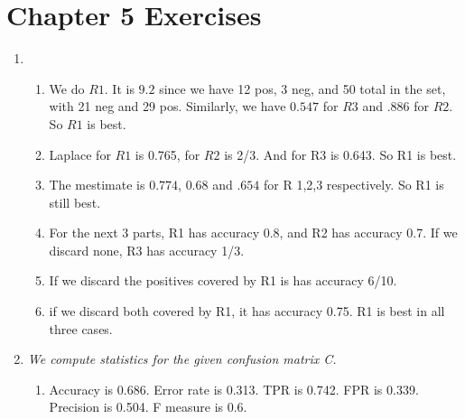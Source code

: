 \documentclass[12pt,oneside,reqno]{amsart}
\theoremstyle{plain}
\theoremstyle{definition}
\theoremstyle{remark}
\begin{document}
\section*{Chapter 5 Exercises}

\begin{enumerate}
\item
\begin{enumerate}
\item 
We do $R1$. It is $9.2$ since we have 12 pos, 3 neg, and 50 total in the set, with 21 neg and 29 pos. Similarly, we have $0.547$ for $R3$ and $.886$ for $R2$. So $R1$ is best. 

\item Laplace for $R1$ is 0.765, for $R2$ is 
2/3. And for R3 is 0.643. So R1 is best. 
\item The mestimate is $0.774$, $0.68$ and $.654$ for R 1,2,3 respectively. So R1 is still best. 
\item For the next 3 parts, R1 has accuracy 0.8, and R2 has accuracy 0.7. If we discard none, R3 has accuracy 1/3. 
\item If we discard the positives covered by R1 is has accuracy 6/10. 
\item if we discard both covered by R1, it has accuracy 0.75. R1 is best in all three cases. 
\end{enumerate}

\item \textit{We compute statistics for the given confusion matrix C. }

\begin{enumerate}
\item Accuracy is 0.686. Error rate is 0.313. TPR is 0.742. FPR is 0.339. Precision is 0.504. F measure is 0.6. 
\end{enumerate}
\end{enumerate}
\end{document}
